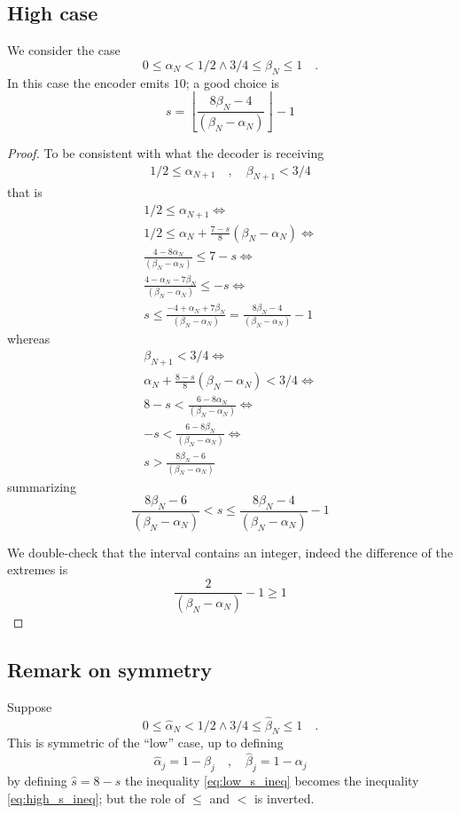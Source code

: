 \documentclass[a4paper,english]{article}
\begin{document}
\subsection{High case}
We consider the case
\[ 0\le \alpha_N< 1/2\land 3/4\le  \beta_N\le 1\quad.\]
In this case the encoder emits $10$; a good choice is
\[s = \left\lfloor \frac{8 \beta_N - 4}{(\beta_N-\alpha_N) }\right\rfloor - 1 \]
\begin{proof}
To be consistent with what the decoder is receiving
\begin{align}
  1/2\le   \alpha_{N+1} \quad,\quad \beta_{N+1}< 3/4
\end{align}
that is
\begin{align*}
  1/2\le   \alpha_{N+1}
  \iff \\
  1/2\le  \alpha_N+\frac{7-s}{8}(\beta_N-\alpha_N)
  \iff \\
  \frac{4- 8 \alpha_N}{(\beta_N-\alpha_N) } \le  7-s
  \iff \\
  \frac{4-  \alpha_N - 7 \beta_N}{(\beta_N-\alpha_N) } \le  -s
  \iff \\
  s\le  \frac{-4+  \alpha_N + 7 \beta_N}{(\beta_N-\alpha_N) } =  \frac{8 \beta_N - 4}{(\beta_N-\alpha_N) } - 1
\end{align*}
whereas
\begin{align*}
  \beta_{N+1}< 3/4
  \iff \\
  \alpha_N+\frac{8-s}{8}(\beta_N-\alpha_N) < 3/4
  \iff\\
  8 -s < \frac{{6 - 8 \alpha_N}}{(\beta_N-\alpha_N)}
  \iff \\
   -s < \frac{{6 - 8 \beta_N}}{(\beta_N-\alpha_N)}
  \iff \\
   s > \frac{{8 \beta_N - 6}}{(\beta_N-\alpha_N)}
\end{align*}
summarizing
\begin{equation}
  \frac{{8 \beta_N - 6}}{(\beta_N-\alpha_N)} <  s\le  \frac{8 \beta_N - 4}{(\beta_N-\alpha_N) } - 1\label{eq:high_s_ineq}
\end{equation}

We double-check that the interval contains an integer, indeed the difference of the extremes is
\[    \frac{2}{(\beta_N-\alpha_N) } - 1 \ge  1 \]
\end{proof}


\subsection{Remark on symmetry}
Suppose
\[ 0\le \hat \alpha_N< 1/2\land 3/4\le \hat \beta_N\le 1\quad.\]
This is symmetric of the ``low'' case, up to defining
\[\hat\alpha_j=1-\beta_j\quad,\quad \hat \beta_j = 1 - \alpha_j \]
by defining $\hat s=8-s$
the inequality
\eqref{eq:low_s_ineq}
becomes  the inequality
\eqref{eq:high_s_ineq};
but the role of $\le$ and $<$ is inverted.
\end{document}
